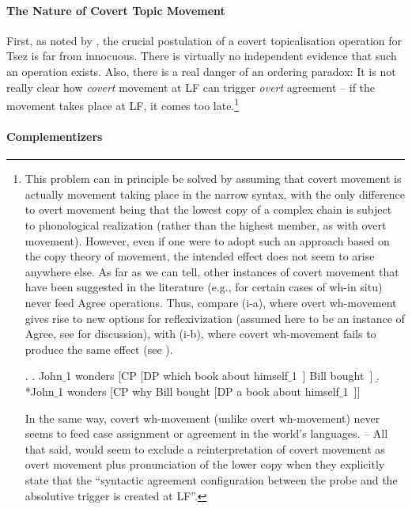 \documentclass[output=paper
,modfonts
,nonflat]{langsci/langscibook}
\begin{document}
\paragraph{The Nature of Covert Topic Movement}

First, as noted by \cite{Boskovic:07}, the crucial postulation of a
covert topicalisation operation for Tsez is far from innocuous. There
is virtually no independent evidence that such an operation
exists. Also, there is a real danger of an ordering paradox: It is not
really clear how {\it covert} movement at LF can trigger {\it overt}
agreement -- if the movement takes place at LF, it comes too
late.\footnote{This problem  can in principle be solved by assuming
  that covert movement is actually movement taking place in the
  narrow syntax, with the only difference to overt movement being that
  the lowest copy of a complex chain is subject to phonological
  realization (rather than the highest member, as with overt movement).
However, even if one were to adopt such an approach based on the copy
theory of movement, the intended effect does not seem to arise
anywhere else. As far as we can tell, other instances of covert
movement that have been suggested in the literature (e.g., for certain
cases of wh-in situ) never feed Agree operations. Thus, compare (i-a),
where overt wh-movement gives rise to new options for reflexivization
(assumed here to be an instance of Agree, see \cite{Reuland:11} for
discussion), with (i-b), where covert wh-movement fails to produce the
same effect (see \cite{Barss:86}). 

\Lsciexi.
 \a. John$\_$1 wonders [CP [DP which book about himself$\_$1~] Bill bought~]
\b. *John$\_$1 wonders [CP why Bill bought [DP a book about himself$\_$1~]]

In the same way, covert wh-movement (unlike overt wh-movement) never seems to feed case
assignment or agreement in the world's languages. -- 
All  that said, \citet[626]{Polinsky&Potsdam:01} would seem to 
exclude a reinterpretation of covert movement as overt movement plus
pronunciation of the lower copy when they explicitly state that the
``syntactic agreement configuration between the probe and the
absolutive trigger is created at LF''.}


\paragraph{Complementizers}
\end{document}
